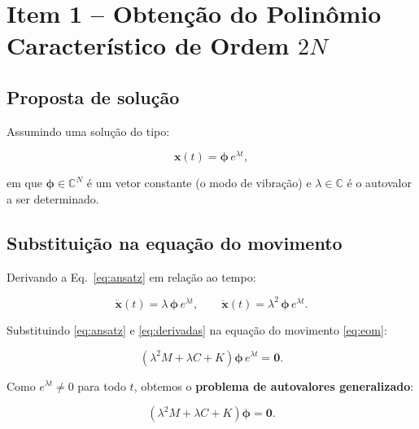 \documentclass[12pt,a4paper]{article}
\begin{document}
\section{Item 1 -- Obtenção do Polinômio Característico de Ordem $2N$}

\subsection{Proposta de solução}

Assumindo uma solução do tipo:

\begin{equation}
    \mathbf{x}(t) = \boldsymbol{\phi}\, e^{\lambda t},
    \label{eq:ansatz}
\end{equation}

\noindent em que $\boldsymbol{\phi} \in \mathbb{C}^N$ é um vetor constante
(o modo de vibração) e $\lambda \in \mathbb{C}$ é o autovalor a ser determinado.

\subsection{Substituição na equação do movimento}


Derivando a Eq.~\eqref{eq:ansatz} em relação ao tempo:

\begin{equation}
    \dot{\mathbf{x}}(t) = \lambda\,\boldsymbol{\phi}\, e^{\lambda t}, \qquad
    \ddot{\mathbf{x}}(t) = \lambda^2\,\boldsymbol{\phi}\, e^{\lambda t}.
    \label{eq:derivadas}
\end{equation}

Substituindo \eqref{eq:ansatz} e \eqref{eq:derivadas} na equação do movimento
\eqref{eq:eom}:

\begin{equation}
    \left(\lambda^2 M + \lambda C + K\right)\boldsymbol{\phi}\, e^{\lambda t}
    = \mathbf{0}.
    \label{eq:subst}
\end{equation}

Como $e^{\lambda t} \neq 0$ para todo $t$, obtemos o \textbf{problema de
autovalores generalizado}:

\begin{equation}
    \boxed{\left(\lambda^2 M + \lambda C + K\right)\boldsymbol{\phi} = \mathbf{0}.}
    \label{eq:autovalor_generalizado}
\end{equation}
\end{document}
